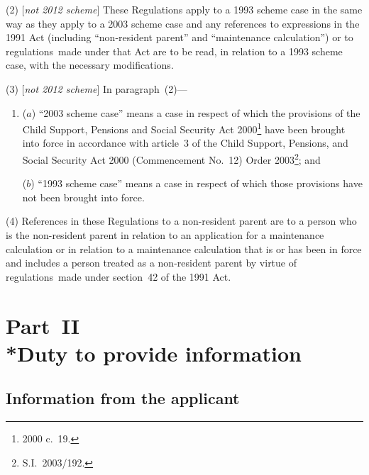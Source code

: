 \documentclass[12pt,a4paper]{article}
\begin{document}
(2) [\emph{not 2012 scheme}] These Regulations apply to a 1993 scheme case in the same way as they apply to a 2003 scheme case and any references to expressions in the 1991 Act (including “non-resident parent” and “maintenance calculation”) or to regulations~made under that Act are to be read, in relation to a 1993 scheme case, with the necessary modifications.

(3) [\emph{not 2012 scheme}] In paragraph~(2)—
\begin{enumerate}\item[]
($a$) “2003 scheme case” means a case in respect of which the provisions of the Child Support, Pensions and Social Security Act 2000\footnote{2000 c.~19.} have been brought into force in accordance with article~3 of the Child Support, Pensions, and Social Security Act 2000 (Commencement No.~12) Order 2003\footnote{S.I.~2003/192.}; and

($b$) “1993 scheme case” means a case in respect of which those provisions have not been brought into force.
\end{enumerate}

(4) References in these Regulations to a non-resident parent are to a person who is the non-resident parent in relation to an application for a maintenance calculation or in relation to a maintenance calculation that is or has been in force and includes a person treated as a non-resident parent by virtue of regulations~made under section~42 of the 1991 Act.


\section[Part~II --- Duty to provide information]{Part~II\\*Duty to provide information}

\renewcommand\parthead{--- Part~II}

\subsection[3. Information from the applicant]{Information from the applicant}
\end{document}
